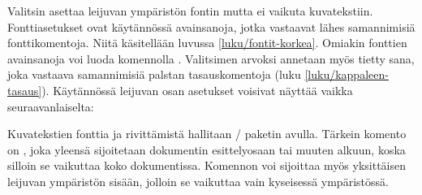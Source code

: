 Valitsin  asettaa leijuvan ympäristön fontin mutta ei
vaikuta kuvatekstiin. Fonttiasetukset ovat käytännössä avainsanoja,
jotka vastaavat lähes samannimisiä fonttikomentoja. Niitä käsitellään
luvussa \ref{luku/fontit-korkea}. Omiakin fonttien avainsanoja voi luoda
komennolla . Valitsimen 
arvoksi annetaan myös tietty sana, joka vastaava samannimisiä palstan
tasauskomentoja (luku \ref{luku/kappaleen-tasaus}). Käytännössä leijuvan
osan asetukset voisivat näyttää vaikka seuraavanlaiselta:

\begin{koodilohkosis}
\end{koodilohkosis}

\noindent
Kuvatekstien fonttia ja rivittämistä hallitaan \-/
paketin avulla. Tärkein komento on , joka yleensä
sijoitetaan dokumentin esittelyosaan tai muuten alkuun, koska silloin se
vaikuttaa koko dokumentissa. Komennon voi sijoittaa myös yksittäisen
leijuvan ympäristön sisään, jolloin se vaikuttaa vain kyseisessä
ympäristössä.

\begin{koodilohkosis}
\captionsetup[tyyppi]{valitsimet}
\end{koodilohkosis}


